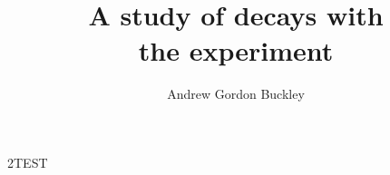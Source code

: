 \documentclass{mythesis}
\title{A study of \BToKPi decays with\\ the \LHCb experiment}
\author{Andrew Gordon Buckley}
\begin{document}
\begin{frontmatter}
  
\end{frontmatter}
2TEST
\begin{mainmatter}
  
  
  
  
  

\end{mainmatter}

\begin{appendices}
  
\end{appendices}

\begin{backmatter}
  
\end{backmatter}

\end{document}
